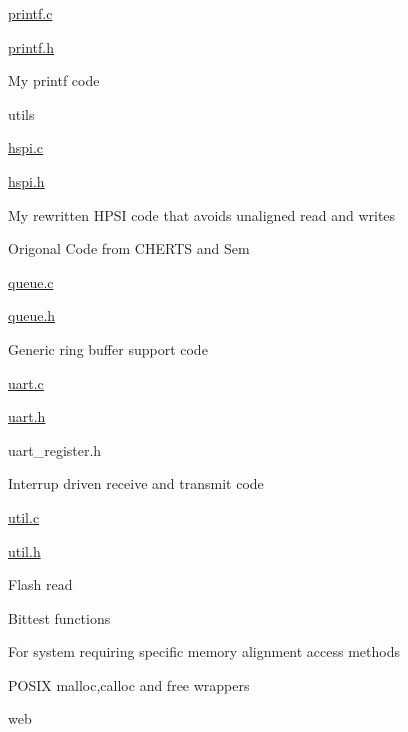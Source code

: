 \begin{DoxyItemize}
\begin{DoxyItemize}
\begin{DoxyItemize}
\item \hyperlink{printf_8c}{printf.\-c}
\item \hyperlink{printf_8h}{printf.\-h}
\begin{DoxyItemize}
\item My printf code
\end{DoxyItemize}
\end{DoxyItemize}
\end{DoxyItemize}
\item utils
\begin{DoxyItemize}
\item \hyperlink{hspi_8c}{hspi.\-c}
\item \hyperlink{hspi_8h}{hspi.\-h}
\begin{DoxyItemize}
\item My rewritten H\-P\-S\-I code that avoids unaligned read and writes
\item Origonal Code from C\-H\-E\-R\-T\-S and Sem
\end{DoxyItemize}
\item \hyperlink{queue_8c}{queue.\-c}
\item \hyperlink{queue_8h}{queue.\-h}
\begin{DoxyItemize}
\item Generic ring buffer support code
\end{DoxyItemize}
\item \hyperlink{uart_8c}{uart.\-c}
\item \hyperlink{uart_8h}{uart.\-h}
\item uart\-\_\-register.\-h
\begin{DoxyItemize}
\item Interrup driven receive and transmit code
\end{DoxyItemize}
\item \hyperlink{util_8c}{util.\-c}
\item \hyperlink{util_8h}{util.\-h}
\begin{DoxyItemize}
\item Flash read
\item Bittest functions
\begin{DoxyItemize}
\item For system requiring specific memory alignment access methods
\end{DoxyItemize}
\item P\-O\-S\-I\-X malloc,calloc and free wrappers
\end{DoxyItemize}
\end{DoxyItemize}
\item web

\end{DoxyItemize}

